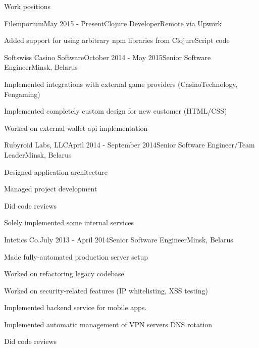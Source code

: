 \documentclass{resume} %
\begin{document}

\begin{rSection}{Work positions}

\begin{rSubsection}{Filemporium}{May 2015 - Present}{Clojure Developer}{Remote via Upwork}
\item Added support for using arbitrary npm libraries from ClojureScript code
\end{rSubsection}

\begin{rSubsection}{Softswiss Casino Software}{October 2014 - May 2015}{Senior Software Engineer}{Minsk, Belarus}
\item Implemented integrations with external game providers (CasinoTechnology, Fengaming)
\item Implemented completely custom design for new customer (HTML/CSS)
\item Worked on external wallet api implementation
\end{rSubsection}

\begin{rSubsection}{Rubyroid Labs, LLC}{April 2014 - September 2014}{Senior Software Engineer/Team Leader}{Minsk, Belarus}
\item Designed application architecture
\item Managed project development
\item Did code reviews
\item Solely implemented some internal services
\end{rSubsection}

\begin{rSubsection}{Intetics Co.}{July 2013 - April 2014}{Senior Software Engineer}{Minsk, Belarus}
\item Made fully-automated production server setup
\item Worked on refactoring legacy codebase
\item Worked on security-related features (IP whitelisting, XSS testing)
\item Implemented backend service for mobile apps.
\item Implemented automatic management of VPN servers DNS rotation
\item Did code reviews
\end{rSubsection}


\end{rSection}
\end{document}
